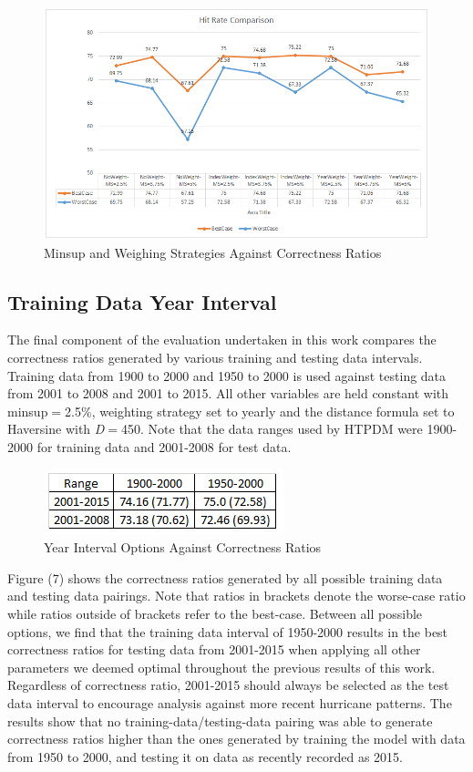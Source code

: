 \documentclass[12pt,conference]{IEEEtran}
\begin{document}
\begin{figure}[!tp]
\centering
\includegraphics[scale=0.8]{Hit-Rate-Weight-Metrics}
\caption{Minsup and Weighing Strategies Against Correctness Ratios}
\end{figure}

\subsection{Training Data Year Interval}

The final component of the evaluation undertaken in this work compares the correctness ratios generated by various training and testing data intervals. Training data from 1900 to 2000 and 1950 to 2000 is used against testing data from 2001 to 2008 and 2001 to 2015. All other variables are held constant with minsup$=$2.5\%, weighting strategy set to yearly and the distance formula set to Haversine with \textit{D}$=$450. Note that the data ranges used by HTPDM were 1900-2000 for training data and 2001-2008 for test data.

\begin{figure}[htp]
\centering
\includegraphics[scale=1.0]{Year-Interval-Metrics}
\caption{Year Interval Options Against Correctness Ratios}
\end{figure}

Figure (7) shows the correctness ratios generated by all possible training data and testing data pairings. Note that ratios in brackets denote the worse-case ratio while ratios outside of brackets refer to the best-case. Between all possible options, we find that the training data interval of 1950-2000 results in the best correctness ratios for testing data from 2001-2015 when applying all other parameters we deemed optimal throughout the previous results of this work. Regardless of correctness ratio, 2001-2015 should always be selected as the test data interval to encourage analysis against more recent hurricane patterns. The results show that no training-data/testing-data pairing was able to generate correctness ratios higher than the ones generated by training the model with data from 1950 to 2000, and testing it on data as recently recorded as 2015.
\end{document}
